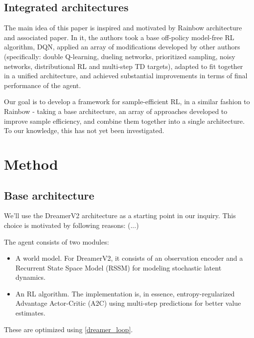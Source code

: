 \documentclass[twoside,11pt]{article}
\begin{document}
\subsection{Integrated architectures}

The main idea of this paper is inspired and motivated by Rainbow architecture and associated paper. In it, the authors took a base off-policy model-free RL algorithm, DQN, applied an array of modifications developed by other authors (specifically: double Q-learning, dueling networks, prioritized sampling, noisy networks, distributional RL and multi-step TD targets), adapted to fit together in a unified architecture, and achieved substantial improvements in terms of final performance of the agent.

Our goal is to develop a framework for sample-efficient RL, in a similar fashion to Rainbow - taking a base architecture, an array of approaches developed to improve sample efficiency, and combine them together into a single architecture. To our knowledge, this has not yet been investigated.

\section{Method}

\subsection{Base architecture}

We'll use the DreamerV2 architecture as a starting point in our inquiry. This choice is motivated by following reasons: (...)

The agent consists of two modules:

\begin{itemize}
    \item A world model. For DreamerV2, it consists of an observation encoder and a Recurrent State Space Model (RSSM) for modeling stochastic latent dynamics.
    \item An RL algorithm. The implementation is, in essence, entropy-regularized Advantage Actor-Critic (A2C) using multi-step predictions for better value estimates.
\end{itemize}

These are optimized using \autoref{dreamer_loop}.
\end{document}
